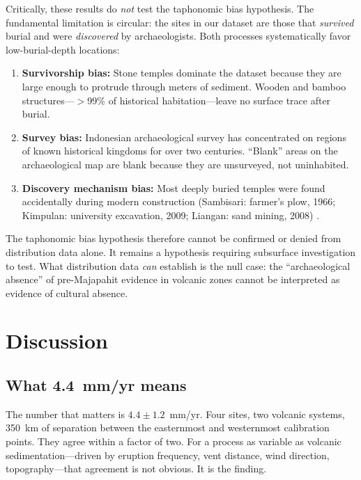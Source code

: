 \documentclass[egqsj, manuscript]{copernicus}
\begin{document}
Critically, these results do \textit{not} test the taphonomic bias hypothesis. The fundamental limitation is circular: the sites in our dataset are those that \textit{survived} burial and were \textit{discovered} by archaeologists. Both processes systematically favor low-burial-depth locations:

\begin{enumerate}
  \item \textbf{Survivorship bias:} Stone temples dominate the dataset because they are large enough to protrude through meters of sediment. Wooden and bamboo structures---$>$99\% of historical habitation---leave no surface trace after burial.
  \item \textbf{Survey bias:} Indonesian archaeological survey has concentrated on regions of known historical kingdoms for over two centuries. ``Blank'' areas on the archaeological map are blank because they are unsurveyed, not uninhabited.
  \item \textbf{Discovery mechanism bias:} Most deeply buried temples were found accidentally during modern construction (Sambisari: farmer's plow, 1966; Kimpulan: university excavation, 2009; Liangan: sand mining, 2008) \citep{putra2019,abbas2016}.
\end{enumerate}

The taphonomic bias hypothesis therefore cannot be confirmed or denied from distribution data alone. It remains a hypothesis requiring subsurface investigation to test. What distribution data \textit{can} establish is the null case: the ``archaeological absence'' of pre-Majapahit evidence in volcanic zones cannot be interpreted as evidence of cultural absence.


\section{Discussion}

\subsection{What 4.4~mm/yr means}

The number that matters is $4.4 \pm 1.2$~mm/yr. Four sites, two volcanic systems, 350~km of separation between the easternmost and westernmost calibration points. They agree within a factor of two. For a process as variable as volcanic sedimentation---driven by eruption frequency, vent distance, wind direction, topography---that agreement is not obvious. It is the finding.
\end{document}
